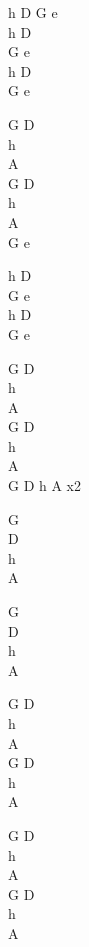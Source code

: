 \begin{chord}
\vin h D G e\\
h D\\
G e\\
h D\\
G e

G D\\
h\\
A\\
G D\\
h\\
A\\
\vin G e

h D\\
G e\\
h D\\
G e

G D\\
h\\
A\\
G D\\
h\\
A\\
\OneColVin G D h A x2

G\\
D\\
h\\
A

G\\
D\\
h\\
A

G D\\
h\\
A\\
G D\\
h\\
A

G D\\
h\\
A\\
G D\\
h\\
A
\end{chord}
